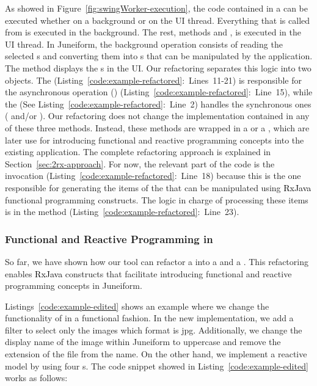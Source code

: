 \documentclass[type=bsc,accentcolor=tud9c]{tudthesis}
\newcommand{\framework}[1]{\textcolor{black}{#1}}
\begin{document}
As showed in Figure~\ref{fig:swingWorker-execution}, the code contained in a  can be executed whether on a background or on the UI thread. Everything that is called from  is executed in the background. The rest, methods  and , is executed in the UI thread. In Juneiform, the background operation consists of reading the selected s and converting them into s that can be manipulated by the application. The method  displays the s in the UI. Our refactoring separates this logic into two objects. The  (Listing~\ref{code:example-refactored}:~Lines~11-21) is responsible for the asynchronous operation () (Listing~\ref{code:example-refactored}:~Line~15), while the  (See Listing~\ref{code:example-refactored}:~Line~2) handles the synchronous ones ( and/or ). Our refactoring does not change the implementation contained in any of these three methods. Instead, these methods are wrapped in a  or a , which are later use for introducing functional and reactive programming concepts into the existing application. The complete refactoring approach is explained in Section~\ref{sec:2rx-approach}. For now, the relevant part of the code is the  invocation (Listing~\ref{code:example-refactored}:~Line~18) because this is the one responsible for generating the items of the  that can be manipulated using \framework{RxJava} functional programming constructs. The logic in charge of processing these items is in the method  (Listing~\ref{code:example-refactored}:~Line~23).



\subsubsection{Functional and Reactive Programming in }

So far, we have shown how our tool can refactor a  into a  and a . This refactoring enables \framework{RxJava} constructs that facilitate introducing functional and reactive programming concepts in Juneiform. 

Listings~\ref{code:example-edited} shows an example where we change the functionality of  in a functional fashion. In the new implementation, we add a filter to select only the images which format is jpg. Additionally, we change the display name of the image within Juneiform to uppercase and remove the extension of the file from the name. On the other hand, we implement a reactive model by using four s. The code snippet showed in Listing~\ref{code:example-edited} works as follows:
\end{document}
